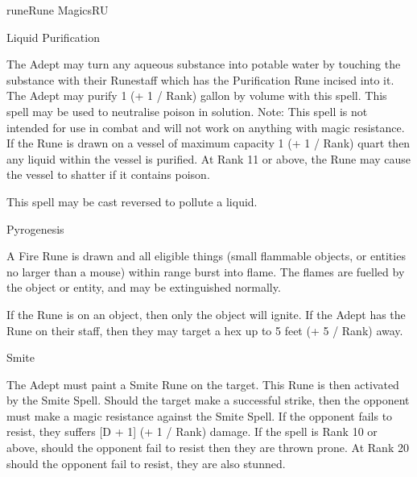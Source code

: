 \begin{College}[2.2]{rune}{Rune Magics}{RU}
\begin{spell}[G-5]{Liquid Purification}

\begin{effects}
The Adept may turn any aqueous substance into potable water by
touching the substance with their Runestaff which has the Purification
Rune incised into it. The Adept may purify 1 (+ 1 / Rank) gallon by
volume with this spell.  This spell may be used to neutralise poison
in solution. Note: This spell is not intended for use in combat and
will not work on anything with magic resistance. If the Rune is drawn
on a vessel of maximum capacity 1 (+ 1 / Rank) quart then any liquid
within the vessel is purified.  At Rank 11 or above, the Rune may
cause the vessel to shatter if it contains poison.

This spell may be cast reversed to pollute a liquid.
\end{effects}
\end{spell}

\begin{spell}[G-6]{Pyrogenesis}

\begin{effects}
A Fire Rune is drawn and all eligible things (small flammable objects,
or entities no larger than a mouse) within range burst into flame.
The flames are fuelled by the object or entity, and may be
extinguished normally.

If the Rune is on an object, then only the object will ignite. If the
Adept has the Rune on their staff, then they may target a hex up to 5
feet (+ 5 / Rank) away.
\end{effects}
\end{spell}

\begin{spell}[G-7]{Smite}

\begin{effects}
The Adept must paint a Smite Rune on the target.  This Rune is then
activated by the Smite Spell.  Should the target make a successful
strike, then the opponent must make a magic resistance against the
Smite Spell.  If the opponent fails to resist, they suffers [D + 1] (+
1 / Rank) damage. If the spell is Rank 10 or above, should the
opponent fail to resist then they are thrown prone.  At Rank 20 should
the opponent fail to resist, they are also stunned.


\end{effects}
\end{spell}
\end{College}
